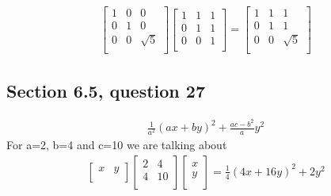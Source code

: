 \documentclass[a4paper,11pt]{article}
\newcommand{\?}{\stackrel{?}{=}}
\begin{document}
\begin{enumerate}
\begin{align*}
\begin{bmatrix}
1 & 0 & 0 \\
0 & 1 & 0 \\
0 & 0 & \sqrt{5} \\
\end{bmatrix}
\begin{bmatrix}
1 & 1 & 1 \\
0 & 1 & 1 \\
0 & 0 & 1 \\
\end{bmatrix}
=
\begin{bmatrix}
1 & 1 & 1 \\
0 & 1 & 1 \\
0 & 0 & \sqrt{5} \\
\end{bmatrix}
\end{align*}
\end{enumerate}
\subsection*{Section 6.5, question 27}
\begin{align*}
\frac{1}{a^2}(ax+by)^2+\frac{ac-b^2}{a}y^2
\end{align*}
For a=2, b=4 and c=10 we are talking about 
\begin{align*}
\begin{bmatrix}
x & y \\
\end{bmatrix}
\begin{bmatrix}
2 & 4 \\
4 & 10 \\
\end{bmatrix}
\begin{bmatrix}
x \\
y \\
\end{bmatrix}
=
\frac{1}{4}(4x+16y)^2+2y^2
\end{align*}
\end{document}
